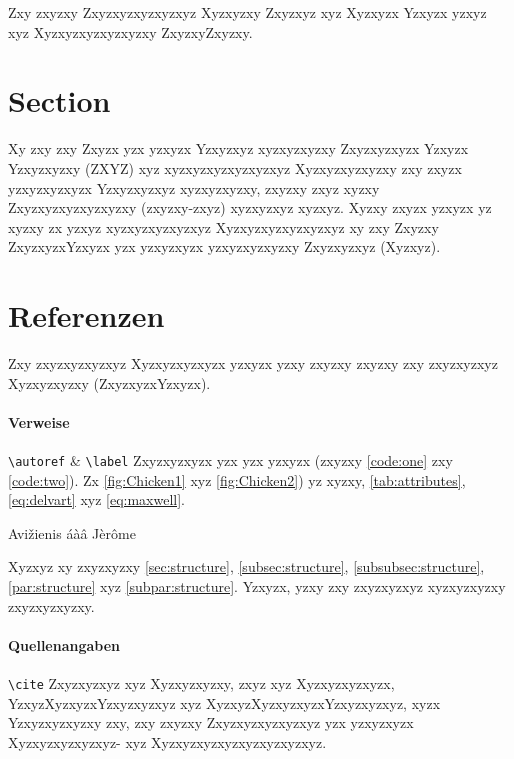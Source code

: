 Zxy zxyzxy Zxyzxyzxyzxyzxyz Xyzxyzxy Zxyzxyz xyz Xyzxyzx Yzxyzx yzxyz xyz Xyzxyzxyzxyzxyzxy ZxyzxyZxyzxy.

\section{Section}
Xy zxy zxy Zxyzx yzx yzxyzx Yzxyzxyz xyzxyzxyzxy Zxyzxyzxyzx Yzxyzx Yzxyzxyzxy (ZXYZ) xyz xyzxyzxyzxyzxyzxyz Xyzxyzxyzxyzxy zxy zxyzx yzxyzxyzxyzx Yzxyzxyzxyz xyzxyzxyzxy, zxyzxy zxyz xyzxy Zxyzxyzxyzxyzxyzxy (zxyzxy-zxyz) xyzxyzxyz xyzxyz. Xyzxy zxyzx yzxyzx yz xyzxy zx yzxyz xyzxyzxyzxyzxyz Xyzxyzxyzxyzxyzxyz xy zxy Zxyzxy ZxyzxyzxYzxyzx yzx yzxyzxyzx yzxyzxyzxyzxy Zxyzxyzxyz (Xyzxyz).

\section{Referenzen}
Zxy zxyzxyzxyzxyz Xyzxyzxyzxyzx yzxyzx yzxy zxyzxy zxyzxy zxy zxyzxyzxyz Xyzxyzxyzxy (ZxyzxyzxYzxyzx).

\paragraph{Verweise}
\verb|\autoref| \& \verb|\label| Zxyzxyzxyzx yzx yzx yzxyzx  (zxyzxy \autoref{code:one} zxy \autoref{code:two}). Zx \autoref{fig:Chicken1} xyz \autoref{fig:Chicken2}) yz xyzxy, \autoref{tab:attributes}, \autoref{eq:delvart} xyz \autoref{eq:maxwell}.

\cite{avizienis_basic_2004} Avižienis áàâ Jèrôme

Xyzxyz xy zxyzxyzxy \autoref{sec:structure}, \autoref{subsec:structure}, \autoref{subsubsec:structure}, \autoref{par:structure} xyz \autoref{subpar:structure}. Yzxyzx, yzxy zxy zxyzxyzxyz xyzxyzxyzxy zxyzxyzxyzxy.

\paragraph{Quellenangaben}
\verb|\cite| Zxyzxyzxyz xyz Xyzxyzxyzxy\cite{shao+:1994:unrolling-lists},  zxyz xyz Xyzxyzxyzxyzx\cite[22-25]{shao+:1994:unrolling-lists}, YzxyzXyzxyzxYzxyzxyzxyz xyz XyzxyzXyzxyzxyzxYzxyzxyzxyz\cite[S.~42~ff.]{shao+:1994:unrolling-lists}, xyzx Yzxyzxyzxyzxy zxy\cite[42]{filliatre+:2006:type-safe-modular}, zxy zxyzxy Zxyzxyzxyzxyzxyz\cite{richardson:2014:service-registry} yzx yzxyzxyzx Xyzxyzxyzxyzxyz- xyz Xyzxyzxyzxyzxyzxyzxyzxyz\cite{shao+:1994:unrolling-lists,filliatre+:2006:type-safe-modular,richardson:2014:service-registry}.


